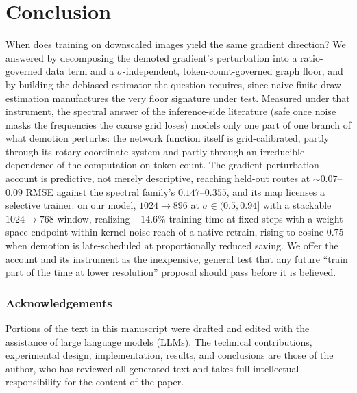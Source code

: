 \section{Conclusion}
\label{sec:conclusion}

When does training on downscaled images yield the same gradient
direction? We answered by decomposing the demoted gradient's
perturbation into a ratio-governed data term and a
$\sigma$-independent, token-count-governed graph floor, and by
building the debiased estimator the question requires, since naive
finite-draw estimation manufactures the very floor signature under
test. Measured under that instrument, the spectral answer of the
inference-side literature (safe once noise masks the frequencies the
coarse grid loses) models only one part of one branch of what
demotion perturbs: the
network function itself is grid-calibrated, partly through its rotary
coordinate system and partly through an irreducible dependence of the
computation on token count. The gradient-perturbation account is predictive, not
merely descriptive, reaching held-out routes at ${\sim}0.07$--$0.09$
RMSE against the spectral family's $0.147$--$0.355$, and its map
licenses a selective trainer: on our model, $1024{\to}896$ at
$\sigma \in (0.5, 0.94]$ with a stackable $1024{\to}768$ window,
realizing $-14.6\%$ training time at fixed steps with a weight-space
endpoint within kernel-noise reach of a native retrain, rising to
cosine $0.75$ when demotion is late-scheduled at proportionally
reduced saving. We offer
the account and its instrument as the inexpensive, general test that any
future ``train part of the time at lower resolution'' proposal should
pass before it is believed.

\subsubsection*{Acknowledgements}
Portions of the text in this manuscript were drafted and edited with
the assistance of large language models (LLMs). The technical
contributions, experimental design, implementation, results, and
conclusions are those of the author, who has reviewed all generated
text and takes full intellectual responsibility for the content of
the paper.
